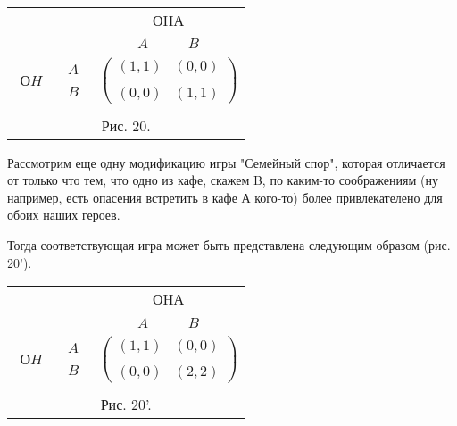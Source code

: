 {\begin{center}
\begin{tabular}{ccc}
&&ОHА\\
&&$\begin{array}{cc} A\quad&\quad B\end{array}$\\
$\begin{array}{c} \\ ОH\\ \end{array}$& $\begin{array}{c} A\\ \\
B\end{array}$& $\left(\begin{array}{cc}
(1,1)&(0,0)\\
\\
(0,0)&(1,1)\end{array}\right) $\\
\multicolumn{3}{c}{}\\
\multicolumn{3}{c}{Рис. 20.}\\
\end{tabular}
\end{center}


Рассмотрим еще одну модификацию игры "Семейный спор", которая
отличается от только что тем, что одно из кафе, скажем B, по
каким-то соображениям (ну например, есть опасения встретить в кафе А
кого-то) более привлекателено для обоих наших героев.

Тогда соответствующая игра может быть представлена следующим образом
(рис. 20').

\begin{center}
\begin{tabular}{ccc}
&&ОHА\\
&&$\begin{array}{cc} A\quad&\quad B\end{array}$\\
$\begin{array}{c} \\ ОH\\ \end{array}$& $\begin{array}{c} A\\ \\
B\end{array}$& $\left(\begin{array}{cc}
(1,1)&(0,0)\\
\\
(0,0)&(2,2)\end{array}\right) $\\
\multicolumn{3}{c}{}\\
\multicolumn{3}{c}{Рис. 20'.}\\
\end{tabular}
\end{center}

}
